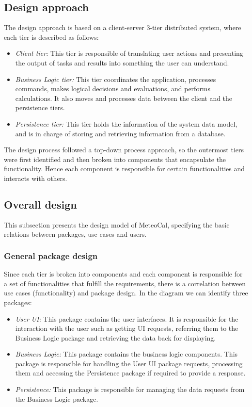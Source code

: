 \documentclass[10pt,a4paper,titlepage]{article}
\begin{document}
\subsection{Design approach}
The design approach is based on a client-server 3-tier distributed system, where each tier is described as follows:
\begin{itemize}
\item \emph{Client tier:} This tier is responsible of translating user actions and presenting the output of tasks and results into something the user can understand.
\item \emph{Business Logic tier:} This tier coordinates the application, processes commands, makes logical decisions and evaluations, and performs calculations. It also moves and processes data between the client and the persistence tiers.
\item \emph{Persistence tier:} This tier holds the information of the system data model, and is in charge of storing and retrieving information from a database. 
\end{itemize}

The design process followed a top-down process approach, so the outermost tiers were first identified and then broken into components that encapsulate the functionality. Hence each component is responsible for certain functionalities and interacts with others.

\subsection{Overall design}
This subsection presents the design model of MeteoCal, specifying the basic relations between packages, use cases and users.

\subsubsection{General package design}
Since each tier is broken into components and each component is responsible for a set of functionalities that fulfill the requirements, there is a correlation between use cases (functionality) and package design. In the diagram we can identify three packages:
\begin{itemize}
\item \emph{User UI:} This package contains the user interfaces. It is responsible for the interaction with the user such as getting UI requests, referring them to the Business Logic package and retrieving the data back for displaying.
\item \emph{Business Logic:} This package contains the business logic components. This package is responsible for handling the User UI package requests, processing them and accessing the Persistence package if required to provide a response.
\item \emph{Persistence:} This package is responsible for managing the data requests from the Business Logic package.
\end{itemize}
\end{document}
